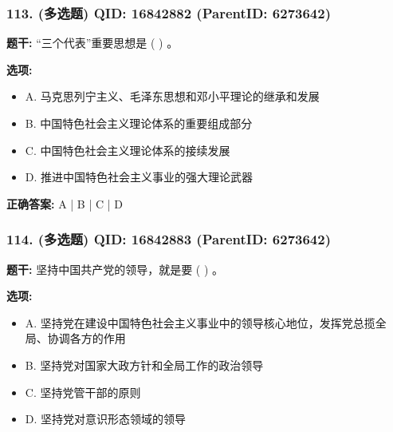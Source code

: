 \documentclass[12pt,UTF8]{ctexart}
\begin{document}
\vspace{0.3em}\hrulefill\vspace{0.7em}

\subsubsection*{113. (多选题) \small QID: 16842882 (ParentID: 6273642)}

\textbf{题干:}
“三个代表”重要思想是 ( ) 。



\textbf{选项:}
\begin{itemize}[leftmargin=*]

  \item A. 马克思列宁主义、毛泽东思想和邓小平理论的继承和发展

  \item B. 中国特色社会主义理论体系的重要组成部分

  \item C. 中国特色社会主义理论体系的接续发展

  \item D. 推进中国特色社会主义事业的强大理论武器

\end{itemize}

\textbf{正确答案:}
A | B | C | D

\vspace{0.3em}\hrulefill\vspace{0.7em}

\subsubsection*{114. (多选题) \small QID: 16842883 (ParentID: 6273642)}

\textbf{题干:}
坚持中国共产党的领导，就是要 ( ) 。



\textbf{选项:}
\begin{itemize}[leftmargin=*]

  \item A. 坚持党在建设中国特色社会主义事业中的领导核心地位，发挥党总揽全局、协调各方的作用

  \item B. 坚持党对国家大政方针和全局工作的政治领导

  \item C. 坚持党管干部的原则

  \item D. 坚持党对意识形态领域的领导

\end{itemize}
\end{document}
